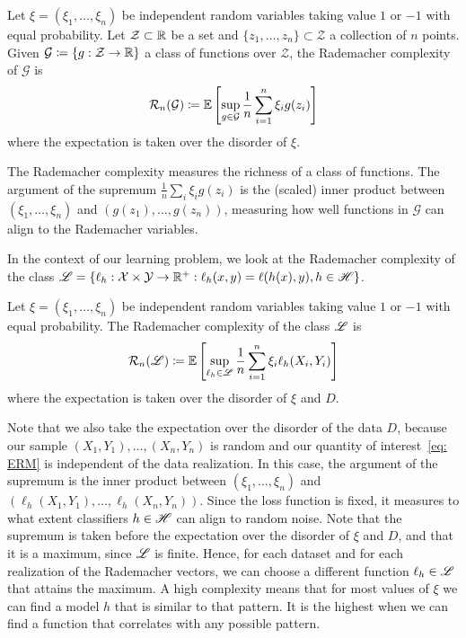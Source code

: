 \documentclass[reqno]{amsart}
\begin{document}
\begin{definition}\label{def: rad gen}
Let $\xi = (\xi_1,\ldots,\xi_n)$ be independent random variables taking value $1$ or $-1$ with equal probability. Let $\mathcal{Z} \subset \mathbb{R}$ be a set and $\{z_1,\ldots,z_n\}\subset \mathcal{Z}$ a collection of $n$ points. Given $\mathcal G\coloneq \{g:\mathcal{Z} \to \mathbb{R}\}$ a class of functions over $\mathcal{Z}$, the Rademacher complexity of $\mathcal G$ is
\[
\mathcal R_n(\mathcal G) \coloneq \mathbb{E} \left[\sup_{g \in \mathcal{G}}\frac{1}{n}\sum_{i=1}^n \xi_i g(z_i)\right]
\]
where the expectation is taken over the disorder of $\xi$. 
\end{definition}

The Rademacher complexity measures the richness of a class of functions. The argument of the supremum $\frac{1}{n}\sum_i\xi_i g(z_i)$ is the (scaled) inner product between $(\xi_1,\ldots,\xi_n)$ and $(g(z_1),\ldots,g(z_n))$, measuring how well functions in $\mathcal{G}$ can align to the Rademacher variables.

In the context of our learning problem, we look at the Rademacher complexity of the class $\mathscr{L} =  \{\ell_h:\mathcal{X}\times\mathcal{Y}\to\mathbb{R}^+ :\ell_h(x,y) = \ell(h(x),y), h \in \mathscr{H} \}$. 

\begin{definition}\label{def: rad}
Let $\xi = (\xi_1,\ldots,\xi_n)$ be independent random variables taking value $1$ or $-1$ with equal probability. The Rademacher complexity of the class $\mathscr{L}$ is
\[
\mathcal R_n(\mathscr{L}) \coloneq \mathbb{E} \left[\sup_{\ell_h\in\mathscr{L}}\frac{1}{n}\sum_{i=1}^n \xi_i \ell_h(X_i, Y_i)\right]
\]
where the expectation is taken over the disorder of $\xi$ and $D$. 
\end{definition}

Note that we also take the expectation over the disorder of the data $D$, because our sample $(X_1,Y_1),\ldots,(X_n,Y_n)$ is random and our quantity of interest~\ref{eq: ERM} is independent of the data realization. 
In this case, the argument of the supremum is the inner product between $(\xi_1,\ldots,\xi_n)$ and $(\ell_h(X_1,Y_1),\ldots,\ell_h(X_n,Y_n))$. Since the loss function is fixed, it measures to what extent classifiers $h\in\mathscr{H}$ can align to random noise. Note that the supremum is taken before the expectation over the disorder of $\xi$ and $D$, and that it is a maximum, since $\mathscr{L}$ is finite. Hence, for each dataset and for each realization of the Rademacher vectors, we can choose a different function $\ell_h \in\mathscr{L}$ that attains the maximum. A high complexity means that for most values of $\xi$ we can find a model $h$ that is similar to that pattern. It is the highest when we can find a function that correlates with any possible pattern.
\end{document}
